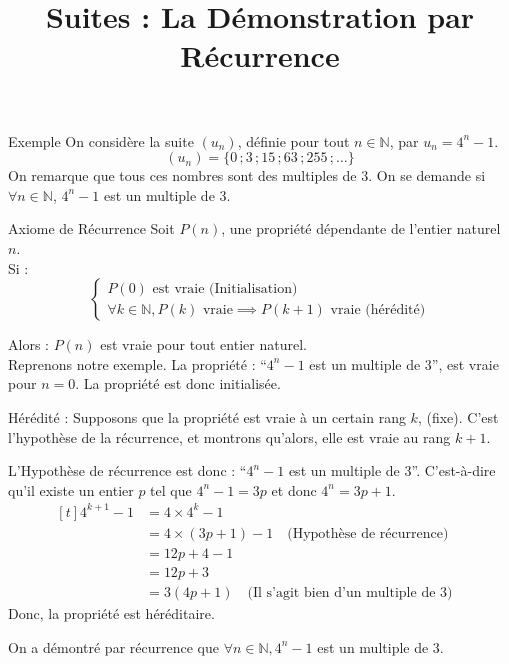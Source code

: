 \documentclass{cours}
\title{Suites : La Démonstration par Récurrence}
\begin{document}

    \begin{Gpartie}{Exemple}
        On considère la suite $\left(u_n\right)$, définie pour tout $n\in\mathbb{N}$, par $u_n=4^n-1$.
            \[\left(u_n\right)=\big\{0\,;3\,;15\,;63\,;255\,;\dotsc\big\}\]
        On remarque que tous ces nombres sont des multiples de 3. On se demande si $\forall n\in\mathbb{N}$, $4^n-1$ est un multiple de 3.
    \end{Gpartie}
    \begin{Gpartie}{Axiome de Récurrence}
        Soit $P(n)$, une propriété dépendante de l'entier naturel $n$.\\
        Si :
        \[\begin{cases}
            P(0)\text{ est vraie (Initialisation)} \\ \forall k\in\mathbb{N}, P(k)\text{ vraie}\implies P(k+1)\text{ vraie (hérédité)}
        \end{cases}\]

        Alors : $P(n)$ est vraie pour tout entier naturel. \\[4ex]
        Reprenons notre exemple. La propriété : ``$4^n-1$ est un multiple de 3'', est vraie pour $n=0$. La propriété est donc initialisée.
        
        Hérédité : Supposons que la propriété est vraie à un certain rang $k$, (fixe). C'est l'hypothèse de la récurrence, et montrons qu'alors, elle est vraie au rang $k+1$.
        
        L'Hypothèse de récurrence est donc : ``$4^n-1$ est un multiple de 3''. C'est-à-dire qu'il existe un entier $p$ tel que $4^n-1=3p$ et donc $4^n=3p+1$.
        \[\begin{aligned}[t]
            4^{k+1}-1&=4\times 4^k-1 &\\
            &= 4\times\left(3p+1\right)-1 \quad \text{(Hypothèse de récurrence)} &\\
            &=12p+4-1 &\\
            &=12p+3 &\\
            &=3\left(4p+1\right) \quad \text{(Il s'agit bien d'un multiple de 3)}
        \end{aligned}\]
        Donc, la propriété est héréditaire.

        On a démontré par récurrence que $\forall n\in\mathbb{N},4^n-1$ est un multiple de 3.
    \end{Gpartie}
\end{document}
